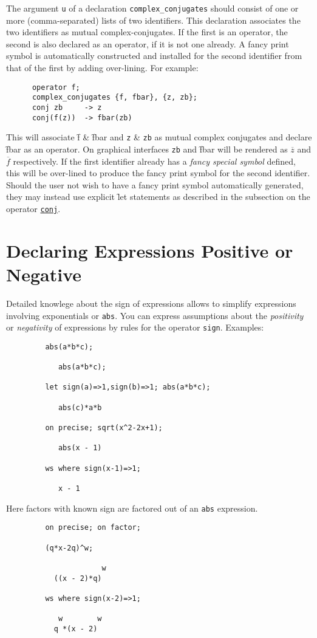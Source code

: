 \hypertarget{command:COMPLEX_CONJUGATES}{}
The argument \texttt{u} of a declaration \texttt{complex\_conjugates}%
 should
consist of one or more (comma-separated) lists of two identifiers.
This declaration associates the two identifiers as
mutual complex-conjugates. If the first is an operator, the second is
also declared as an operator, if it is not one already. A fancy print symbol 
is automatically constructed and installed for the second identifier
from that of the first by adding over-lining. For example:
\begin{verbatim} 
      operator f;
      complex_conjugates {f, fbar}, {z, zb};
      conj zb     -> z
      conj(f(z))  -> fbar(zb)  
\end{verbatim}
This will associate \f{f} \& \f{fbar} and \texttt{z} \& \texttt{zb}
as mutual complex conjugates and declare \f{fbar} as an operator.
On graphical interfaces \texttt{zb} and \f{fbar} will be rendered as
$\overline{z}$ and $\overline{f}$ respectively. If the first identifier
already has a \emph{fancy special symbol} defined, this will be over-lined
to produce the fancy print symbol for the second identifier.
Should the user not wish to have a fancy print symbol automatically generated,
they may instead use explicit \f{let} statements as described in the 
subsection on the operator \hyperlink{operator:CONJ}{\texttt{conj}}.

\section{Declaring Expressions Positive or Negative}

Detailed knowlege about the sign of expressions allows {\REDUCE}
to simplify expressions involving exponentials or \texttt{abs}.
You can express assumptions about the 
\emph{positivity} or \emph{negativity}
of expressions by rules for the operator \texttt{sign}.
Examples:
\begin{verbatim}
         abs(a*b*c);
      
            abs(a*b*c);

         let sign(a)=>1,sign(b)=>1; abs(a*b*c);

            abs(c)*a*b

         on precise; sqrt(x^2-2x+1);

            abs(x - 1)

         ws where sign(x-1)=>1;

            x - 1
\end{verbatim}
Here factors with known sign are factored out of an \texttt{abs} expression.
\begin{verbatim}
         on precise; on factor; 

         (q*x-2q)^w;

                      w
           ((x - 2)*q)

         ws where sign(x-2)=>1;

            w        w
           q *(x - 2)

\end{verbatim}
       
